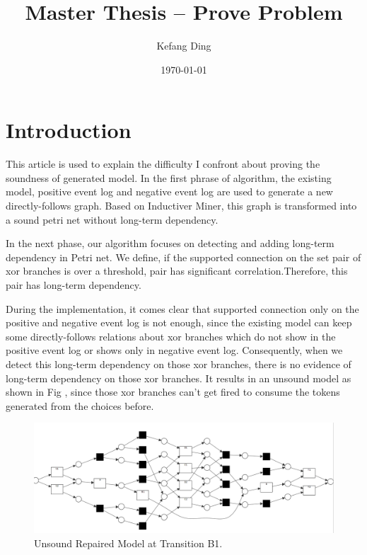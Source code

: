 \documentclass[]{article}
\title{Master Thesis -- Prove Problem}
\author{Kefang Ding}
\date{\today}
\begin{document}
\maketitle
\hrulefill
\hrulefill 
\section{Introduction}
This article is used to explain the difficulty I confront about proving the soundness of generated model.
In the first phrase of algorithm, the existing model, positive event log and negative event log are used to generate a new directly-follows graph. Based on Inductiver Miner, this graph is transformed into a sound petri net without long-term dependency. 

In the next phase, our algorithm focuses on detecting and adding long-term dependency in Petri net. We define, if the supported connection on the set pair of xor branches is over a threshold, pair has significant correlation.Therefore, this pair has long-term dependency.

During the implementation, it comes clear that supported connection only on the positive and negative event log is not enough, since the existing model can keep some directly-follows relations about xor branches which do not show in the positive event log or shows only in negative event log. Consequently, when we detect this long-term dependency on those xor branches, there is no evidence of long-term dependency on those xor branches. It results in an unsound model as shown in Fig , since those xor branches can't get fired to consume the tokens generated from the choices before.
\begin{figure}[!h]
	\includegraphics[width=\textwidth]{PN_tc_and_03_01.png}
	\caption{Unsound Repaired Model at Transition B1.}
	\label{fig:unsound_example}
\end{figure}
\end{document}
